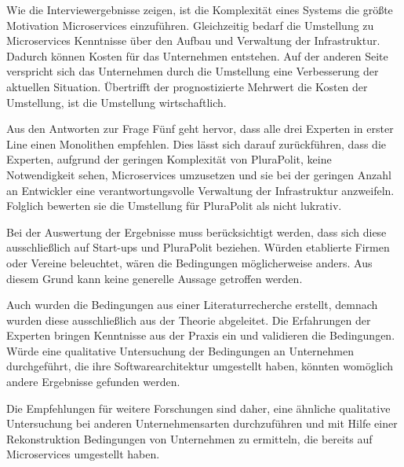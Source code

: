 Wie die Interviewergebnisse zeigen, ist die Komplexität eines Systems die größte Motivation Microservices einzuführen. Gleichzeitig bedarf die Umstellung zu Microservices Kenntnisse über den Aufbau und Verwaltung der Infrastruktur. Dadurch können Kosten für das Unternehmen entstehen. Auf der anderen Seite verspricht sich das Unternehmen durch die Umstellung eine Verbesserung der aktuellen Situation. Übertrifft der prognostizierte Mehrwert die Kosten der Umstellung, ist die Umstellung wirtschaftlich.

Aus den Antworten zur Frage Fünf geht hervor, dass alle drei Experten in erster Line einen Monolithen empfehlen. Dies lässt sich darauf zurückführen, dass die Experten, aufgrund der geringen Komplexität von PluraPolit, keine Notwendigkeit sehen, Microservices umzusetzen und sie bei der geringen Anzahl an Entwickler eine verantwortungsvolle Verwaltung der Infrastruktur anzweifeln. Folglich bewerten sie die Umstellung für PluraPolit als nicht lukrativ.

Bei der Auswertung der Ergebnisse muss berücksichtigt werden, dass sich diese ausschließlich auf Start-ups und PluraPolit beziehen. Würden etablierte Firmen oder Vereine beleuchtet, wären die Bedingungen möglicherweise anders. Aus diesem Grund kann keine generelle Aussage getroffen werden.

Auch wurden die Bedingungen aus einer Literaturrecherche erstellt, demnach wurden diese ausschließlich aus der Theorie abgeleitet. Die Erfahrungen der Experten bringen Kenntnisse aus der Praxis ein und validieren die Bedingungen. Würde eine qualitative Untersuchung der Bedingungen an Unternehmen durchgeführt, die ihre Softwarearchitektur umgestellt haben, könnten womöglich andere Ergebnisse gefunden werden.

Die Empfehlungen für weitere Forschungen sind daher, eine ähnliche qualitative Untersuchung bei anderen Unternehmensarten durchzuführen und mit Hilfe einer Rekonstruktion Bedingungen von Unternehmen zu ermitteln, die bereits auf Microservices umgestellt haben.
